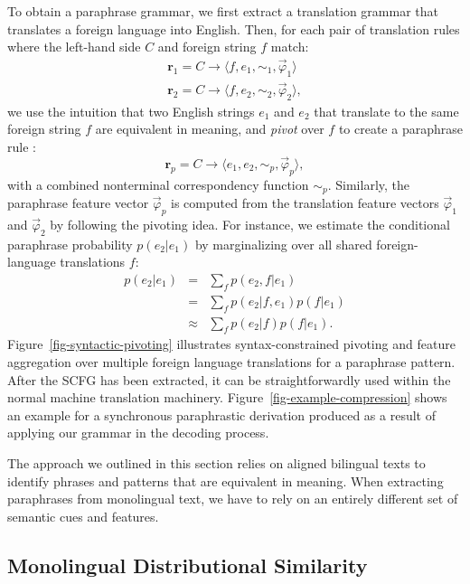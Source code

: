 \documentclass[11pt]{article}
\begin{document}
To obtain a paraphrase grammar, we first extract a translation grammar
that translates a foreign language into English. Then, for each pair
of translation rules where the left-hand side $C$ and foreign string
$f$ match:
\begin{eqnarray*}
    \mathbf{r}_1 = C \rightarrow \langle f, e_1, \sim_1, \vec{\varphi}_1
  \rangle \phantom{,} \\
  \mathbf{r}_2 = C \rightarrow \langle f, e_2, \sim_2, \vec{\varphi}_2
  \rangle ,
\end{eqnarray*}
we use the intuition that two English strings $e_1$ and $e_2$ that
translate to the same foreign string $f$ are equivalent in meaning,
and \emph{pivot} over $f$ to create a paraphrase rule
\cite{Ganitkevitch2011,Callison-Burch2008,Callison-Burch2005}:
\begin{equation*}
  \mathbf{r}_p = C \rightarrow \langle e_1, e_2, \sim_p, \vec{\varphi}_p \rangle ,
\end{equation*}
with a combined nonterminal correspondency function $\sim_p$.
Similarly, the paraphrase feature vector $\vec{\varphi}_p$ is computed
from the translation feature vectors $\vec{\varphi}_1$ and
$\vec{\varphi}_2$ by following the pivoting idea. For instance, we
estimate the conditional paraphrase probability $p(e_2 | e_1)$ by
marginalizing over all shared foreign-language translations $f$:
\begin{eqnarray}
  p(e_2|e_1) &=& \sum_f p(e_2,f|e_1)\\
  &=& \sum_f p(e_2|f,e_1) p(f|e_1) \\
  &\approx& \sum_f p(e_2|f) p(f|e_1) .
\label{eq-paraphrase-probability}
\end{eqnarray}
Figure~\ref{fig-syntactic-pivoting} illustrates syntax-constrained
pivoting and feature aggregation over multiple foreign language
translations for a paraphrase pattern. After the SCFG has been
extracted, it can be straightforwardly used within the normal machine
translation machinery.  Figure~\ref{fig-example-compression} shows an
example for a synchronous paraphrastic derivation produced as a result
of applying our grammar in the decoding process.

The approach we outlined in this section relies on aligned bilingual
texts to identify phrases and patterns that are equivalent in
meaning. When extracting paraphrases from monolingual text, we have to
rely on an entirely different set of semantic cues and features.

\subsection{Monolingual Distributional Similarity}
\label{sec-mds}
\end{document}
